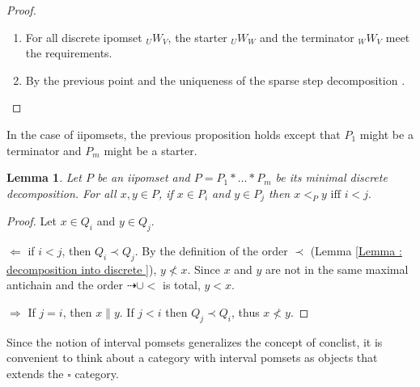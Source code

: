 \documentclass[11pt,a4paper,oldfontcommands]{memoir}
\newtheorem{lemma}[definition]{Lemma}
\begin{document}
\begin{proof}
    \begin{enumerate}
        \item For all discrete ipomset ${}_{U}W {}_{V}$, the starter ${}_{U}W {}_{W}$ and the terminator ${}_{W}W {}_{V}$ meet the requirements.
        \item By the previous point and the uniqueness of the sparse step decomposition \cite{MyhillNerode}.
    \end{enumerate}
\end{proof}
In the case of iipomsets, the previous proposition holds except that $P_1$ might be a terminator and $P_m$ might be a starter.
\begin{lemma} \label{lemma: maximal deco propery}
    Let $P$ be an iipomset and $P=P_1* \dots * P_m$ be its minimal discrete decomposition. For all $x,y \in P$, if $x \in P_i$ and $y \in P_j$ then $x <_P y \text{ iff } i < j.$
\end{lemma}
\begin{proof} Let $x \in Q_i$ and $y \in Q_j$.


    $\Leftarrow$ if $i<j$, then $Q_i \prec Q_j$. By the definition of the order $\prec$ (Lemma \ref{Lemma : decomposition into discrete }), $y \nless x$. Since $x$ and $y$ are not in the same maximal antichain and the order $\dashrightarrow \cup <$ is total, $y<x$.

    
    $\Rightarrow$ If $j = i$, then $x \parallel y$. If $j<i$ then $Q_j \prec Q_i$, thus $x \nless y$.
\end{proof}
Since the notion of interval pomsets generalizes the concept of conclist, it is convenient to think about a category with interval pomsets as objects that extends the $\square$ category. 
\end{document}
